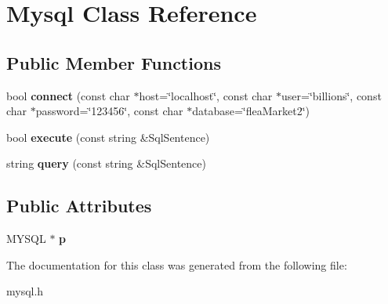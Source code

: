 \hypertarget{classMysql}{}\section{Mysql Class Reference}
\label{classMysql}
\subsection*{Public Member Functions}
\begin{DoxyCompactItemize}
\item 
\mbox{\label{classMysql_a4ba5ab785eff2f5222f746bbea1d425d}} 
bool {\bfseries connect} (const char $\ast$host=\char`\"{}localhost\char`\"{}, const char $\ast$user=\char`\"{}billions\char`\"{}, const char $\ast$password=\char`\"{}123456\char`\"{}, const char $\ast$database=\char`\"{}flea\+Market2\char`\"{})
\item 
\mbox{\label{classMysql_a379a7268596be68a18121dfeac3cd097}} 
bool {\bfseries execute} (const string \&Sql\+Sentence)
\item 
\mbox{\label{classMysql_a8ae91a035b0927869ef6a8e64cd893de}} 
string {\bfseries query} (const string \&Sql\+Sentence)
\end{DoxyCompactItemize}
\subsection*{Public Attributes}
\begin{DoxyCompactItemize}
\item 
\mbox{\label{classMysql_aa277c70c117d65e9145ded86a1e6b7e8}} 
M\+Y\+S\+QL $\ast$ {\bfseries p}
\end{DoxyCompactItemize}


The documentation for this class was generated from the following file\+:\begin{DoxyCompactItemize}
\item 
mysql.\+h\end{DoxyCompactItemize}
